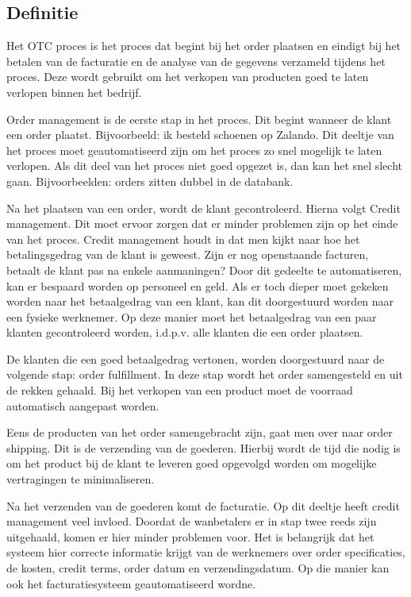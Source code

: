 \subsection{Definitie}
Het OTC proces is het proces dat begint bij het order plaatsen en eindigt bij het betalen van de facturatie en de analyse van de gegevens verzameld tijdens het proces. Deze wordt gebruikt om het verkopen van producten goed te laten verlopen binnen het bedrijf.

Order management is de eerste stap in het proces. Dit begint wanneer de klant een order plaatst. Bijvoorbeeld: ik besteld schoenen op Zalando. Dit deeltje van het proces moet geautomatiseerd zijn om het proces zo snel mogelijk te laten verlopen. Als dit deel van het proces niet goed opgezet  is, dan kan het snel slecht gaan. Bijvoorbeelden: orders zitten dubbel in de databank.

Na het plaatsen van een order, wordt de klant gecontroleerd. Hierna volgt Credit management. Dit moet ervoor zorgen dat er minder problemen zijn op het einde van het proces. Credit management houdt in dat men kijkt naar hoe het betalingsgedrag van de klant is geweest. Zijn er nog openstaande facturen, betaalt de klant pas na enkele aanmaningen? Door dit gedeelte te automatiseren, kan er bespaard worden op personeel en geld. Als er toch dieper moet gekeken worden naar het betaalgedrag van een klant, kan dit doorgestuurd worden naar een fysieke werknemer. Op deze manier moet het betaalgedrag van een paar klanten gecontroleerd worden, i.d.p.v. alle klanten die een order plaatsen.
 
De klanten die een goed betaalgedrag vertonen, worden doorgestuurd naar de volgende stap: order fulfillment. In deze stap wordt het order samengesteld en uit de rekken gehaald. Bij het verkopen van een product moet de voorraad automatisch aangepast worden. 

Eens de producten van het order samengebracht zijn, gaat  men  over naar order shipping. Dit is de verzending van de goederen. Hierbij wordt de tijd  die nodig is om het product bij de klant te leveren goed opgevolgd worden om mogelijke vertragingen te minimaliseren.  

Na het verzenden van de goederen komt de facturatie. Op dit deeltje heeft credit management veel invloed. Doordat de wanbetalers er in stap twee reeds zijn uitgehaald, komen er hier minder problemen voor. Het is belangrijk dat het systeem hier correcte informatie krijgt van de werknemers over order specificaties, de kosten, credit terms, order datum en verzendingsdatum. Op die manier kan ook het facturatiesysteem geautomatiseerd wordne.

